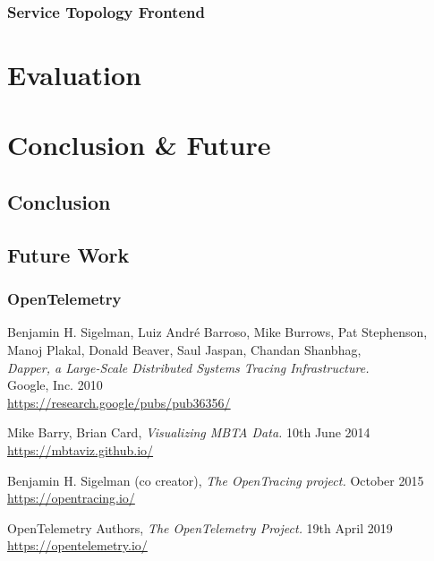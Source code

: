 \documentclass[12pt,pdftex,titlepage]{report}
\begin{document}
            \subsection{Service Topology Frontend}
            

    \chapter{Evaluation}
    
    \chapter{Conclusion \& Future}
        \section{Conclusion}

        \section{Future Work}
            \subsection{OpenTelemetry}

    \begin{thebibliography}{69}

        Benjamin H. Sigelman, Luiz André Barroso, Mike Burrows, Pat Stephenson, Manoj Plakal, Donald Beaver, Saul Jaspan, Chandan Shanbhag, \\
        \textit{Dapper, a Large-Scale Distributed Systems Tracing Infrastructure.} \\
        Google, Inc. 2010 \\
        \url{https://research.google/pubs/pub36356/}

        Mike Barry, Brian Card, \textit{Visualizing MBTA Data.}
        10th June 2014 \\
        \url{https://mbtaviz.github.io/}

        Benjamin H. Sigelman (co creator), \textit{The OpenTracing project.}
        October 2015 \\
        \url{https://opentracing.io/}

        OpenTelemetry Authors, \textit{The OpenTelemetry Project.} 
        19th April 2019 \\
        \url{https://opentelemetry.io/}
    \end{thebibliography}
\end{document}
